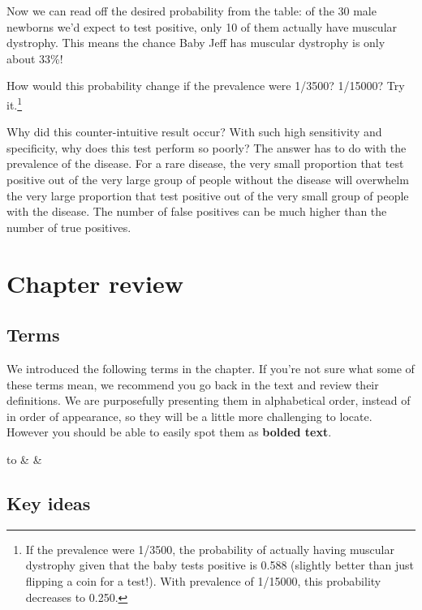 \documentclass[
  10pt,
  openany]{book}
\theoremstyle{definition}
\theoremstyle{definition}
\theoremstyle{definition}
\theoremstyle{definition}
\theoremstyle{remark}
\begin{document}
Now we can read off the desired probability from the table: of the 30 male newborns we'd expect to test positive, only 10 of them actually have muscular dystrophy. This means the chance Baby Jeff has muscular dystrophy is only about 33\%!

How would this probability change if the prevalence were 1/3500? 1/15000? Try it.\footnote{If the prevalence were 1/3500, the probability of actually having muscular dystrophy given that the baby tests positive is 0.588 (slightly better than just flipping a coin for a test!). With prevalence of 1/15000, this probability decreases to 0.250.}

Why did this counter-intuitive result occur? With such high sensitivity and specificity, why does this test perform so poorly? The answer has to do with the prevalence of the disease. For a rare disease, the very small proportion that test positive out of the very large group of people without the disease will overwhelm the very large proportion that test positive out of the very small group of people with the disease. The number of false positives can be much higher than the number of true positives.

\section{Chapter review}\label{chp23-review}

\subsection*{Terms}\label{terms-17}

We introduced the following terms in the chapter.
If you're not sure what some of these terms mean, we recommend you go back in the text and review their definitions.
We are purposefully presenting them in alphabetical order, instead of in order of appearance, so they will be a little more challenging to locate.
However you should be able to easily spot them as \textbf{bolded text}.

\begin{tabu} to 
\toprule
{} &  & \\
\bottomrule
\end{tabu}

\subsection*{Key ideas}\label{key-ideas-7}
\end{document}
